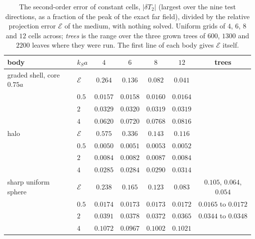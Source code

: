 \documentclass[11pt,a4paper]{article}
\newcommand{\cE}{\mathcal{E}}
\begin{document}
\begin{table}[htbp]
\centering
\caption{The second-order error of constant cells, $|\delta T_2|$ (largest over the nine test directions,
as a fraction of the peak of the exact far field), divided by the relative projection error $\cE$ of the
medium, with nothing solved. Uniform grids of $4$, $6$, $8$ and $12$ cells across; \emph{trees}
is the range over the three grown trees of $600$, $1300$ and $2200$ leaves where they were run. The first
line of each body gives $\cE$ itself.}\label{tab:secondenergy}
\small
\begin{tabular}{@{}llccccc@{}}
\toprule
body & $k_Sa$ & $4$ & $6$ & $8$ & $12$ & trees \\
\midrule
graded shell, core $0.75a$ & $\cE$ & $0.264$ & $0.136$ & $0.082$ & $0.041$ & \\
                           & $0.5$ & $0.0157$ & $0.0158$ & $0.0160$ & $0.0164$ & \\
                           & $2$   & $0.0329$ & $0.0320$ & $0.0319$ & $0.0319$ & \\
                           & $4$   & $0.0620$ & $0.0720$ & $0.0768$ & $0.0816$ & \\
\midrule
halo                       & $\cE$ & $0.575$ & $0.336$ & $0.143$ & $0.116$ & \\
                           & $0.5$ & $0.0050$ & $0.0051$ & $0.0053$ & $0.0052$ & \\
                           & $2$   & $0.0084$ & $0.0082$ & $0.0087$ & $0.0084$ & \\
                           & $4$   & $0.0285$ & $0.0284$ & $0.0290$ & $0.0314$ & \\
\midrule
sharp uniform sphere       & $\cE$ & $0.238$ & $0.165$ & $0.123$ & $0.083$ & $0.105$, $0.064$, $0.054$ \\
                           & $0.5$ & $0.0174$ & $0.0173$ & $0.0173$ & $0.0172$ & $0.0165$ to $0.0172$ \\
                           & $2$   & $0.0391$ & $0.0378$ & $0.0372$ & $0.0365$ & $0.0344$ to $0.0348$ \\
                           & $4$   & $0.1072$ & $0.0967$ & $0.1002$ & $0.1021$ & \\
\bottomrule
\end{tabular}
\end{table}
\end{document}
